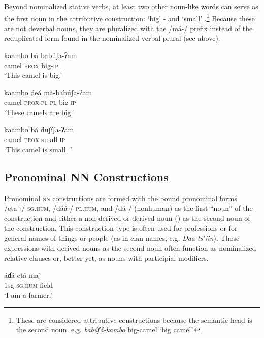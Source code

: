 \documentclass[output=paper]{langsci/langscibook}
\begin{document}
Beyond nominalized stative verbs, at least two other noun-like words can serve as the first noun in the attributive construction: ‘big’ - and ‘small’ .\footnote{These are considered attributive constructions because the semantic head is the second noun, e.g. \textit{bab\'{u}ʃá-kambo} big-camel ‘big camel’.} Because these are not deverbal nouns, they are pluralized with the /má-/ prefix  instead of the reduplicated form found in the nominalized verbal plural (see  above).

\ea\label{ex:ahlandc:52}
\gll
kaambo bá      bab\'{u}ʃa-ʔam  \\
camel    \textsc{prox}  big-\textsc{ip} \\
\glt
‘This camel is big.’
\z

\ea\label{ex:ahlandc:53}
\gll
kaambo deá          má-bab\'{u}ʃa-ʔam   \\
camel    \textsc{prox.pl}  \textsc{pl-}big\textsc{{}-ip} \\
\glt
‘These camels are big.’
\z

\ea\label{ex:ahlandc:54}
\gll
kaambo bá  duʃíʃa-ʔam  \\
camel    \textsc{prox}  small-\textsc{ip} \\
\glt
‘This camel is small. ’
\z

\subsection{Pronominal NN Constructions}\label{sec:ahlandc:8.3}

Pronominal \textsc{nn} constructions are formed with the bound pronominal forms /eta\'{ }{}-/ \textsc{sg.hum}, /dáá-/ \textsc{pl.hum}, and /dá-/ (nonhuman) as the first “noun” of the construction and either a non-derived  or derived noun () as the second noun of the construction. This construction type is often used for professions  or for general names of things or people (as in clan names, e.g. \textit{Daa-ts}\textit{ʼíin}).   Those expressions with derived nouns as the second noun often function as nominalized relative clauses or, better yet, as nouns with participial modifiers. 

\ea\label{ex:ahlandc:55}
\ea\label{ex:ahlandc:55a}
\gll
áɗá  etá-maj   \\
  1sg  \textsc{sg.hum}{}-field\\
\glt
  ‘I am a farmer.’
\end{document}
